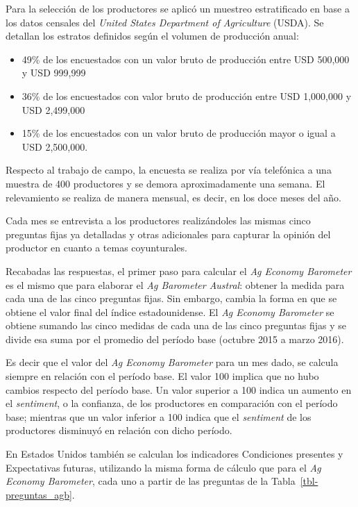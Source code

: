 \documentclass[12pt]{article}
\providecommand{\tightlist}{%
  \setlength{\itemsep}{0pt}\setlength{\parskip}{0pt}}\usepackage{longtable,booktabs,array}
\begin{document}
Para la selección de los productores se aplicó un muestreo estratificado
en base a los datos censales del \emph{United States Department of
Agriculture} (USDA). Se detallan los estratos definidos según el volumen
de producción anual:

\begin{itemize}
\tightlist
\item
  49\% de los encuestados con un valor bruto de producción entre USD
  500,000 y USD 999,999
\item
  36\% de los encuestados con valor bruto de producción entre USD
  1,000,000 y USD 2,499,000
\item
  15\% de los encuestados con un valor bruto de producción mayor o igual
  a USD 2,500,000.
\end{itemize}

Respecto al trabajo de campo, la encuesta se realiza por vía telefónica
a una muestra de 400 productores y se demora aproximadamente una semana.
El relevamiento se realiza de manera mensual, es decir, en los doce
meses del año.

Cada mes se entrevista a los productores realizándoles las mismas cinco
preguntas fijas ya detalladas y otras adicionales para capturar la
opinión del productor en cuanto a temas coyunturales.

Recabadas las respuestas, el primer paso para calcular el \emph{Ag
Economy Barometer} es el mismo que para elaborar el \emph{Ag Barometer
Austral}: obtener la medida para cada una de las cinco preguntas fijas.
Sin embargo, cambia la forma en que se obtiene el valor final del índice
estadounidense. El \emph{Ag Economy Barometer} se obtiene sumando las
cinco medidas de cada una de las cinco preguntas fijas y se divide esa
suma por el promedio del período base (octubre 2015 a marzo 2016).

Es decir que el valor del \emph{Ag Economy Barometer} para un mes dado,
se calcula siempre en relación con el período base. El valor 100 implica
que no hubo cambios respecto del período base. Un valor superior a 100
indica un aumento en el \emph{sentiment}, o la confianza, de los
productores en comparación con el período base; mientras que un valor
inferior a 100 indica que el \emph{sentiment} de los productores
disminuyó en relación con dicho período.

En Estados Unidos también se calculan los indicadores Condiciones
presentes y Expectativas futuras, utilizando la misma forma de cálculo
que para el \emph{Ag Economy Barometer}, cada uno a partir de las
preguntas de la Tabla~\ref{tbl-preguntas_agb}.
\end{document}

